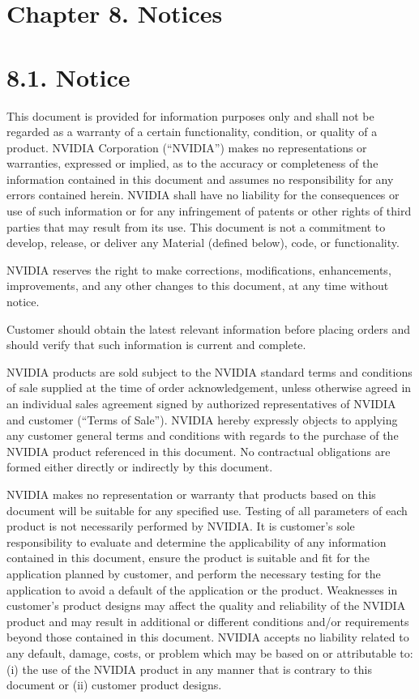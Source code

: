 \documentclass[
  10
]{article}
\begin{document}
\section{Chapter 8. Notices}\label{chapter-8.-notices}

\section{8.1. Notice}\label{notice}

This document is provided for information purposes only and shall not be
regarded as a warranty of a certain functionality, condition, or quality
of a product. NVIDIA Corporation (``NVIDIA'') makes no representations
or warranties, expressed or implied, as to the accuracy or completeness
of the information contained in this document and assumes no
responsibility for any errors contained herein. NVIDIA shall have no
liability for the consequences or use of such information or for any
infringement of patents or other rights of third parties that may result
from its use. This document is not a commitment to develop, release, or
deliver any Material (defined below), code, or functionality.

NVIDIA reserves the right to make corrections, modifications,
enhancements, improvements, and any other changes to this document, at
any time without notice.

Customer should obtain the latest relevant information before placing
orders and should verify that such information is current and complete.

NVIDIA products are sold subject to the NVIDIA standard terms and
conditions of sale supplied at the time of order acknowledgement, unless
otherwise agreed in an individual sales agreement signed by authorized
representatives of NVIDIA and customer (``Terms of Sale''). NVIDIA
hereby expressly objects to applying any customer general terms and
conditions with regards to the purchase of the NVIDIA product referenced
in this document. No contractual obligations are formed either directly
or indirectly by this document.

NVIDIA makes no representation or warranty that products based on this
document will be suitable for any specified use. Testing of all
parameters of each product is not necessarily performed by NVIDIA. It is
customer's sole responsibility to evaluate and determine the
applicability of any information contained in this document, ensure the
product is suitable and fit for the application planned by customer, and
perform the necessary testing for the application to avoid a default of
the application or the product. Weaknesses in customer's product designs
may affect the quality and reliability of the NVIDIA product and may
result in additional or different conditions and/or requirements beyond
those contained in this document. NVIDIA accepts no liability related to
any default, damage, costs, or problem which may be based on or
attributable to: (i) the use of the NVIDIA product in any manner that is
contrary to this document or (ii) customer product designs.
\end{document}
